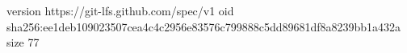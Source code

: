 version https://git-lfs.github.com/spec/v1
oid sha256:ee1deb109023507cea4c4c2956e83576c799888c5dd89681df8a8239bb1a432a
size 77
